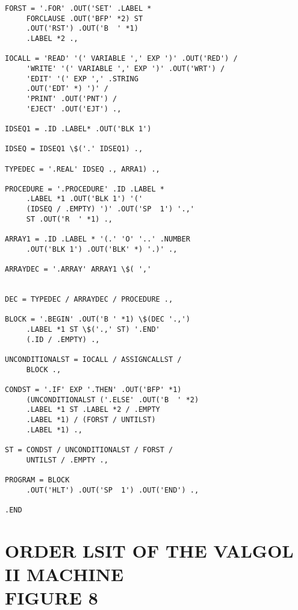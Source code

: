 \documentclass[twocolumn]{article}
\begin{document}
\begin{verbatim}
FORST = '.FOR' .OUT('SET' .LABEL *
     FORCLAUSE .OUT('BFP' *2) ST
     .OUT('RST') .OUT('B  ' *1)
     .LABEL *2 .,

IOCALL = 'READ' '(' VARIABLE ',' EXP ')' .OUT('RED') /
     'WRITE' '(' VARIABLE ',' EXP ')' .OUT('WRT') /
     'EDIT' '(' EXP ',' .STRING
     .OUT('EDT' *) ')' /
     'PRINT' .OUT('PNT') /
     'EJECT' .OUT('EJT') .,

IDSEQ1 = .ID .LABEL* .OUT('BLK 1')

IDSEQ = IDSEQ1 \$('.' IDSEQ1) .,

TYPEDEC = '.REAL' IDSEQ ., ARRA1) .,

PROCEDURE = '.PROCEDURE' .ID .LABEL *
     .LABEL *1 .OUT('BLK 1') '('
     (IDSEQ / .EMPTY) ')' .OUT('SP  1') '.,'
     ST .OUT('R  ' *1) .,

ARRAY1 = .ID .LABEL * '(.' 'O' '..' .NUMBER
     .OUT('BLK 1') .OUT('BLK' *) '.)' .,

ARRAYDEC = '.ARRAY' ARRAY1 \$( ',' 


DEC = TYPEDEC / ARRAYDEC / PROCEDURE .,

BLOCK = '.BEGIN' .OUT('B ' *1) \$(DEC '.,')
     .LABEL *1 ST \$('.,' ST) '.END'
     (.ID / .EMPTY) .,

UNCONDITIONALST = IOCALL / ASSIGNCALLST /
     BLOCK .,

CONDST = '.IF' EXP '.THEN' .OUT('BFP' *1)
     (UNCONDITIONALST ('.ELSE' .OUT('B  ' *2)
     .LABEL *1 ST .LABEL *2 / .EMPTY
     .LABEL *1) / (FORST / UNTILST)
     .LABEL *1) .,

ST = CONDST / UNCONDITIONALST / FORST /
     UNTILST / .EMPTY .,

PROGRAM = BLOCK
     .OUT('HLT') .OUT('SP  1') .OUT('END') .,

.END
\end{verbatim}

\pagebreak

\section{ORDER LSIT OF THE VALGOL II MACHINE\\FIGURE 8}
\end{document}
